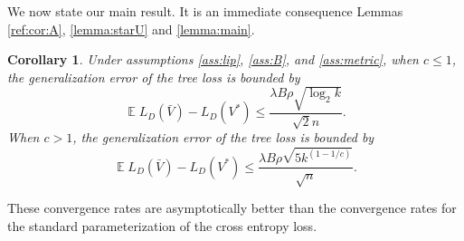 \documentclass[twoside]{article}
\newtheorem{corollary}{Corollary}
\DeclareMathOperator{\E}{\mathbb E}
\begin{document}
We now state our main result.
It is an immediate consequence Lemmas \ref{ref:cor:A}, \ref{lemma:starU} and \ref{lemma:main}.
\begin{corollary}
    \label{cor:main}
    Under assumptions \ref{ass:lip}, \ref{ass:B}, and \ref{ass:metric},
    when $c\le1$, the generalization error of the tree loss is bounded by
\begin{equation}
    \E L_D(\bar V) - L_D(V^*)
    \le \frac {\lambda B\rho \sqrt{\log_2 k}}{\sqrt 2n}
    .
\end{equation}
    When $c>1$, the generalization error of the tree loss is bounded by
\begin{equation}
    \E L_D(\bar V) - L_D(V^*)
    \le \frac {\lambda B\rho \sqrt{5 k^{(1-1/c)}}}{\sqrt n}
    .
\end{equation}
\end{corollary}
These convergence rates are asymptotically better than the convergence rates for the standard parameterization of the cross entropy loss.


\end{document}
